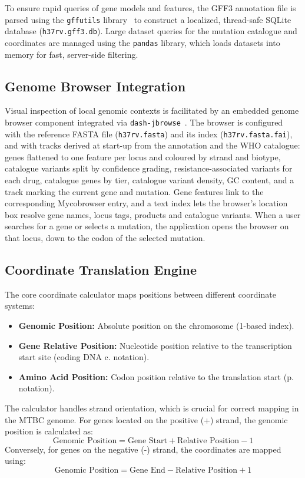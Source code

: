 \documentclass{article}
\begin{document}
To ensure rapid queries of gene models and features, the GFF3 annotation file is parsed using the \texttt{gffutils} library~\cite{gffutils} to construct a localized, thread-safe SQLite database (\texttt{h37rv.gff3.db}). Large dataset queries for the mutation catalogue and coordinates are managed using the \texttt{pandas} library, which loads datasets into memory for fast, server-side filtering. 

\subsection{Genome Browser Integration}
Visual inspection of local genomic contexts is facilitated by an embedded genome browser component integrated via \texttt{dash-jbrowse}~\cite{jbrowse2}. The browser is configured with the reference FASTA file (\texttt{h37rv.fasta}) and its index (\texttt{h37rv.fasta.fai}), and with tracks derived at start-up from the annotation and the WHO catalogue: genes flattened to one feature per locus and coloured by strand and biotype, catalogue variants split by confidence grading, resistance-associated variants for each drug, catalogue genes by tier, catalogue variant density, GC content, and a track marking the current gene and mutation. Gene features link to the corresponding Mycobrowser entry, and a text index lets the browser's location box resolve gene names, locus tags, products and catalogue variants. When a user searches for a gene or selects a mutation, the application opens the browser on that locus, down to the codon of the selected mutation.

\subsection{Coordinate Translation Engine}
The core coordinate calculator maps positions between different coordinate systems:
\begin{itemize}
    \item \textbf{Genomic Position:} Absolute position on the chromosome (1-based index).
    \item \textbf{Gene Relative Position:} Nucleotide position relative to the transcription start site (coding DNA c. notation).
    \item \textbf{Amino Acid Position:} Codon position relative to the translation start (p. notation).
\end{itemize}

The calculator handles strand orientation, which is crucial for correct mapping in the MTBC genome. For genes located on the positive (+) strand, the genomic position is calculated as:
\begin{equation}
    \text{Genomic Position} = \text{Gene Start} + \text{Relative Position} - 1
\end{equation}
Conversely, for genes on the negative (-) strand, the coordinates are mapped using:
\begin{equation}
    \text{Genomic Position} = \text{Gene End} - \text{Relative Position} + 1
\end{equation}
\end{document}
